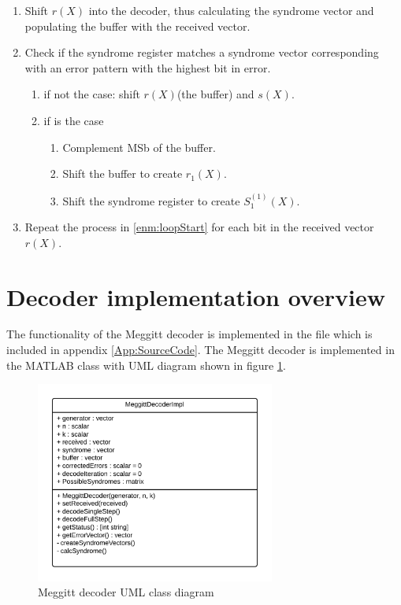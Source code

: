 \documentclass[Main]{subfiles}
\begin{document}
\begin{enumerate}
\item Shift $r(X)$ into the decoder, thus calculating the syndrome vector and populating the buffer with the received vector.
\item \label{enm:loopStart} Check if the syndrome register matches a syndrome vector corresponding with an error pattern with the highest bit in error.
\begin{enumerate}
\item if not the case: shift $r(X)$(the buffer) and $s(X)$.
\item if is the case
\begin{enumerate}
\item Complement MSb of the buffer.
\item Shift the buffer to create $r_1(X)$.
\item Shift the syndrome register to create $S_1^{(1)}(X)$.
\end{enumerate}
\end{enumerate}
\item Repeat the process in \ref{enm:loopStart} for each bit in the received vector $r(X)$.
\end{enumerate}

\section{Decoder implementation overview}

The functionality of the Meggitt decoder is implemented in the file  which is included in appendix \ref{App:SourceCode}. The Meggitt decoder is implemented in the MATLAB class  with UML diagram shown in figure \ref{fig:meggittUML}.

\begin{figure}[h]
    \centering
    \includegraphics[width=0.7\textwidth]{figures/MeggitDecoderUML}
    \caption{Meggitt decoder UML class diagram}
    \label{fig:meggittUML}
\end{figure}
\end{document}
